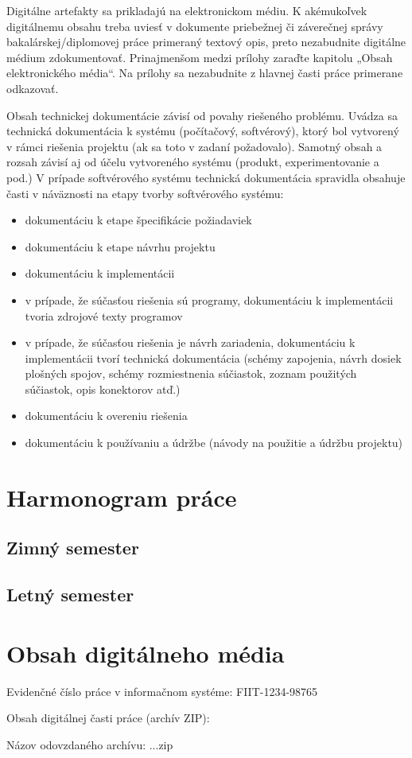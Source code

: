 \documentclass[12pt, a4paper, twoside, openright, slovak]{book}
\newcommand{\RegNo}[0] {FIIT-1234-98765}
\begin{document}
Digitálne artefakty sa prikladajú na elektronickom médiu. K akémukoľvek
digitálnemu obsahu treba uviesť v dokumente priebežnej či záverečnej správy
bakalárskej/diplomovej práce primeraný textový opis, preto nezabudnite digitálne médium
zdokumentovať. Prinajmenšom medzi prílohy zaraďte kapitolu „Obsah elektronického média“.
Na prílohy sa nezabudnite z hlavnej časti práce primerane odkazovať.

Obsah technickej dokumentácie závisí od povahy riešeného problému. Uvádza sa technická dokumentácia k systému (počítačový, softvérový), ktorý bol vytvorený v rámci riešenia projektu (ak sa toto v zadaní požadovalo). Samotný obsah a rozsah závisí aj od účelu vytvoreného systému (produkt, experimentovanie a pod.)
V prípade softvérového systému technická dokumentácia spravidla obsahuje časti v náväznosti na etapy tvorby softvérového systému:
\begin{itemize}
	\item dokumentáciu k etape špecifikácie požiadaviek
    \item dokumentáciu k etape návrhu projektu
    \item dokumentáciu k implementácii
    \item v prípade, že súčasťou riešenia sú programy, dokumentáciu k implementácii tvoria zdrojové texty programov
    \item v prípade, že súčasťou riešenia je návrh zariadenia, dokumentáciu k implementácii tvorí technická dokumentácia (schémy zapojenia, návrh dosiek plošných spojov, schémy rozmiestnenia súčiastok, zoznam použitých súčiastok, opis konektorov atď.)
    \item dokumentáciu k overeniu riešenia
    \item dokumentáciu k používaniu a údržbe (návody na použitie a údržbu projektu)
\end{itemize}


\thispagestyle{empty}
\chapter{Harmonogram práce}
\renewcommand*{\thepage}{B-\arabic{page}}
\section{Zimný semester}
\section{Letný semester}

\thispagestyle{empty}

\chapter{Obsah digitálneho média}
\renewcommand*{\thepage}{C-\arabic{page}}
\par Evidenčné číslo práce v informačnom systéme: \RegNo
\par Obsah digitálnej časti práce (archív ZIP):
\par Názov odovzdaného archívu: ...zip
\end{document}
